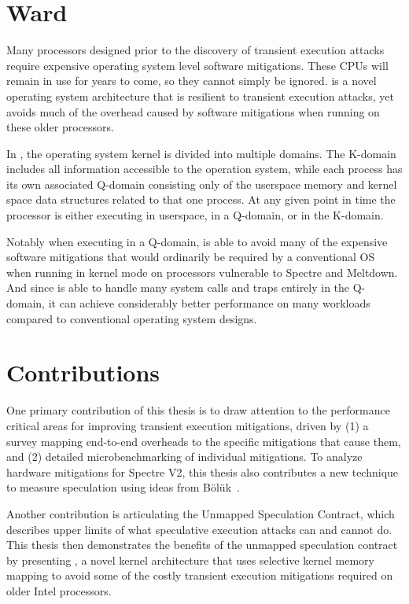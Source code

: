 \section{Ward}
Many processors designed prior to the discovery of transient execution attacks require expensive operating system level software mitigations.
These CPUs will remain in use for years to come, so they cannot simply be ignored.
\sys is a novel operating system architecture that is resilient to transient execution attacks, yet avoids much of the overhead caused by software mitigations when running on these older processors.

In \sys, the operating system kernel is divided into multiple domains.
The K-domain includes all information accessible to the operation system, while each process has its own associated Q-domain consisting only of the userspace memory and kernel space data structures related to that one process.
At any given point in time the processor is either executing in userspace, in a Q-domain, or in the K-domain. 

Notably when executing in a Q-domain, \sys is able to avoid many of the expensive software mitigations that would ordinarily be required by a conventional OS when running in kernel mode on processors vulnerable to Spectre and Meltdown.
And since \sys is able to handle many system calls and traps entirely in the Q-domain, it can achieve considerably better performance on many workloads compared to conventional operating system designs.

\section{Contributions}

One primary contribution of this thesis is to draw attention to the performance critical areas for improving transient execution mitigations, driven by 
(1) a survey mapping end-to-end overheads to the specific mitigations that cause them, and 
(2) detailed microbenchmarking of individual mitigations.
To analyze hardware mitigations for Spectre V2, this thesis also contributes a new technique to measure speculation using ideas from Bölük~\cite{speculating-x86}.

Another contribution is articulating the Unmapped Speculation Contract, which describes upper limits of what speculative execution attacks can and cannot do.
This thesis then demonstrates the benefits of the unmapped speculation contract
by presenting \sys{}, a novel kernel architecture that uses
selective kernel memory mapping to avoid some of the costly transient execution
mitigations required on older Intel processors.

